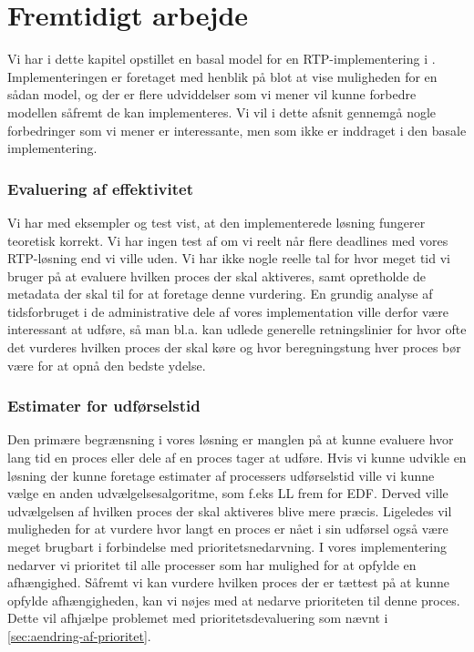 \section{Fremtidigt arbejde}
Vi har i dette kapitel opstillet en basal model for en RTP-implementering i \pycsp. Implementeringen er foretaget med henblik på blot at vise muligheden for en sådan model, og der er flere udviddelser som vi mener vil kunne forbedre modellen såfremt de kan implementeres. Vi vil i dette afsnit gennemgå nogle forbedringer som vi mener er interessante, men som ikke er inddraget i den basale implementering. 

\subsubsection{Evaluering af effektivitet}
Vi har med eksempler og test vist, at den implementerede løsning fungerer teoretisk korrekt. Vi har ingen test af om vi reelt når flere deadlines med vores RTP-løsning end vi ville uden. Vi har ikke nogle reelle tal for hvor meget tid vi bruger på at evaluere hvilken proces der skal aktiveres, samt opretholde de metadata der skal til for at foretage denne vurdering. En grundig analyse af tidsforbruget i de administrative dele af vores implementation ville derfor være interessant at udføre, så man bl.a. kan udlede generelle retningslinier for hvor ofte det vurderes hvilken proces der skal køre og hvor beregningstung hver proces bør være for at opnå den bedste ydelse. 

\subsubsection{Estimater for udførselstid}
Den primære begrænsning i vores løsning er manglen på at kunne evaluere hvor lang tid en proces eller dele af en proces tager at udføre. Hvis vi kunne udvikle en løsning der kunne foretage estimater af processers udførselstid ville vi kunne vælge en anden udvælgelsesalgoritme, som f.eks LL frem for EDF. Derved ville udvælgelsen af hvilken proces der skal aktiveres blive mere præcis. Ligeledes vil muligheden for at vurdere hvor langt en proces er nået i sin udførsel også være meget brugbart i forbindelse med prioritetsnedarvning. I vores implementering nedarver vi prioritet til alle processer som har mulighed for at opfylde en afhængighed. Såfremt vi kan vurdere hvilken proces der er tættest på at kunne opfylde afhængigheden, kan vi nøjes med at nedarve prioriteten til denne proces. Dette vil afhjælpe problemet med prioritetsdevaluering som nævnt i \cref{sec:aendring-af-prioritet}.

